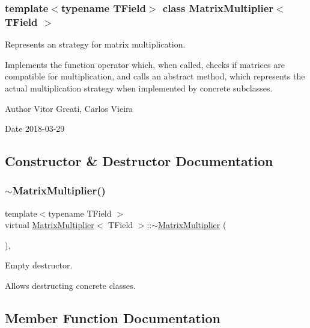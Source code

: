 \subsubsection*{template$<$typename T\+Field$>$\newline
class Matrix\+Multiplier$<$ T\+Field $>$}

Represents an strategy for matrix multiplication. 

Implements the function operator which, when called, checks if matrices are compatible for multiplication, and calls an abstract method, which represents the actual multiplication strategy when implemented by concrete subclasses.

\begin{DoxyAuthor}{Author}
Vitor Greati, Carlos Vieira 
\end{DoxyAuthor}
\begin{DoxyDate}{Date}
2018-\/03-\/29 
\end{DoxyDate}


\subsection{Constructor \& Destructor Documentation}
\mbox{\label{classMatrixMultiplier_a2c2ef9361dfb7fed622abbb282ba2269}} 
\subsubsection{\texorpdfstring{$\sim$\+Matrix\+Multiplier()}{~MatrixMultiplier()}}
{\footnotesize\ttfamily template$<$typename T\+Field $>$ \\
virtual \mbox{\hyperlink{classMatrixMultiplier}{Matrix\+Multiplier}}$<$ T\+Field $>$\+::$\sim$\mbox{\hyperlink{classMatrixMultiplier}{Matrix\+Multiplier}} (\begin{DoxyParamCaption}{ }\end{DoxyParamCaption})\hspace{0.3cm}{\ttfamily [inline]}, {\ttfamily [virtual]}}



Empty destructor. 

Allows destructing concrete classes. 

\subsection{Member Function Documentation}
\mbox{\label{classMatrixMultiplier_ae3ad21bb6cbe616e4890b20b8d98f4f6}} 
